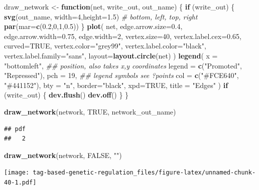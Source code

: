 \documentclass[
]{book}
\newenvironment{Shaded}{\begin{snugshade}}{\end{snugshade}}
\newcommand{\CommentTok}[1]{\textcolor[rgb]{0.56,0.35,0.01}{\textit{#1}}}
\newcommand{\ControlFlowTok}[1]{\textcolor[rgb]{0.13,0.29,0.53}{\textbf{#1}}}
\newcommand{\DataTypeTok}[1]{\textcolor[rgb]{0.13,0.29,0.53}{#1}}
\newcommand{\DecValTok}[1]{\textcolor[rgb]{0.00,0.00,0.81}{#1}}
\newcommand{\FloatTok}[1]{\textcolor[rgb]{0.00,0.00,0.81}{#1}}
\newcommand{\KeywordTok}[1]{\textcolor[rgb]{0.13,0.29,0.53}{\textbf{#1}}}
\newcommand{\NormalTok}[1]{#1}
\newcommand{\OtherTok}[1]{\textcolor[rgb]{0.56,0.35,0.01}{#1}}
\newcommand{\StringTok}[1]{\textcolor[rgb]{0.31,0.60,0.02}{#1}}
\begin{document}
\begin{Shaded}
\begin{Highlighting}[]
\NormalTok{draw\_network \textless{}{-}}\StringTok{ }\ControlFlowTok{function}\NormalTok{(net, write\_out, out\_name) \{}
  \ControlFlowTok{if}\NormalTok{ (write\_out) \{}
    \KeywordTok{svg}\NormalTok{(out\_name, }\DataTypeTok{width=}\DecValTok{4}\NormalTok{,}\DataTypeTok{height=}\FloatTok{1.5}\NormalTok{)}
    \CommentTok{\# bottom, left, top, right}
    \KeywordTok{par}\NormalTok{(}\DataTypeTok{mar=}\KeywordTok{c}\NormalTok{(}\FloatTok{0.2}\NormalTok{,}\DecValTok{0}\NormalTok{,}\DecValTok{1}\NormalTok{,}\FloatTok{0.5}\NormalTok{))}
\NormalTok{  \}}
  \KeywordTok{plot}\NormalTok{(}
\NormalTok{    net,}
    \DataTypeTok{edge.arrow.size=}\FloatTok{0.4}\NormalTok{,}
    \DataTypeTok{edge.arrow.width=}\FloatTok{0.75}\NormalTok{,}
    \DataTypeTok{edge.width=}\DecValTok{2}\NormalTok{,}
    \DataTypeTok{vertex.size=}\DecValTok{40}\NormalTok{,}
    \DataTypeTok{vertex.label.cex=}\FloatTok{0.65}\NormalTok{,}
    \DataTypeTok{curved=}\OtherTok{TRUE}\NormalTok{,}
    \DataTypeTok{vertex.color=}\StringTok{"grey99"}\NormalTok{,}
    \DataTypeTok{vertex.label.color=}\StringTok{"black"}\NormalTok{,}
    \DataTypeTok{vertex.label.family=}\StringTok{"sans"}\NormalTok{,}
    \DataTypeTok{layout=}\KeywordTok{layout.circle}\NormalTok{(net)}
\NormalTok{  )}
  \KeywordTok{legend}\NormalTok{(}
    \DataTypeTok{x =} \StringTok{"bottomleft"}\NormalTok{,      }\CommentTok{\#\# position, also takes x,y coordinates}
    \DataTypeTok{legend =} \KeywordTok{c}\NormalTok{(}\StringTok{"Promoted"}\NormalTok{, }\StringTok{"Repressed"}\NormalTok{),}
    \DataTypeTok{pch =} \DecValTok{19}\NormalTok{,              }\CommentTok{\#\# legend symbols see ?points}
    \DataTypeTok{col =} \KeywordTok{c}\NormalTok{(}\StringTok{"\#FCE640"}\NormalTok{, }\StringTok{"\#441152"}\NormalTok{),}
    \DataTypeTok{bty =} \StringTok{"n"}\NormalTok{,}
    \DataTypeTok{border=}\StringTok{"black"}\NormalTok{,}
    \DataTypeTok{xpd=}\OtherTok{TRUE}\NormalTok{,}
    \DataTypeTok{title =} \StringTok{"Edges"}
\NormalTok{  )}
  \ControlFlowTok{if}\NormalTok{ (write\_out) \{}
    \KeywordTok{dev.flush}\NormalTok{()}
    \KeywordTok{dev.off}\NormalTok{()}
\NormalTok{  \}}
\NormalTok{\}}

\KeywordTok{draw\_network}\NormalTok{(network, }\OtherTok{TRUE}\NormalTok{, network\_out\_name)}
\end{Highlighting}
\end{Shaded}

\begin{verbatim}
## pdf 
##   2
\end{verbatim}

\begin{Shaded}
\begin{Highlighting}[]
\KeywordTok{draw\_network}\NormalTok{(network, }\OtherTok{FALSE}\NormalTok{, }\StringTok{""}\NormalTok{)}
\end{Highlighting}
\end{Shaded}

\texttt{[image: tag-based-genetic-regulation\_files/figure-latex/unnamed-chunk-40-1.pdf]}
\end{document}
